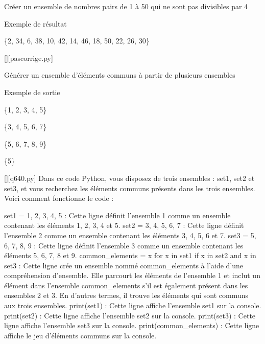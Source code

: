         \question
        Créer un ensemble de nombres pairs de 1 à 50 qui ne sont pas divisibles par 4

Exemple de résultat

\{2, 34, 6, 38, 10, 42, 14, 46, 18, 50, 22, 26, 30\}
        \par
        \begin{solution}
            \renewcommand{\nomfichier}{pascorrige.py}
            \pythonfile{\chemincode \nomfichier}[][\nomfichier]
            
        \end{solution}
        

        \question
        Générer un ensemble d'éléments communs à partir de plusieurs ensembles

Exemple de sortie

\{1, 2, 3, 4, 5\}

\{3, 4, 5, 6, 7\}

\{5, 6, 7, 8, 9\}

\{5\}
        \par
        \begin{solution}
            \renewcommand{\nomfichier}{q640.py}
            \pythonfile{\chemincode \nomfichier}[][\nomfichier]
            Dans ce code Python, vous disposez de trois ensembles : set1, set2 et set3, et vous recherchez les éléments communs présents dans les trois ensembles. Voici comment fonctionne le code :

    set1 = {1, 2, 3, 4, 5} : Cette ligne définit l'ensemble 1 comme un ensemble contenant les éléments 1, 2, 3, 4 et 5.
    set2 = {3, 4, 5, 6, 7} : Cette ligne définit l'ensemble 2 comme un ensemble contenant les éléments 3, 4, 5, 6 et 7.
    set3 = {5, 6, 7, 8, 9} : Cette ligne définit l'ensemble 3 comme un ensemble contenant les éléments 5, 6, 7, 8 et 9.
    common_elements = {x for x in set1 if x in set2 and x in set3} : Cette ligne crée un ensemble nommé common_elements à l'aide d'une compréhension d'ensemble. Elle parcourt les éléments de l'ensemble 1 et inclut un élément dans l'ensemble common_elements s'il est également présent dans les ensembles 2 et 3. En d'autres termes, il trouve les éléments qui sont communs aux trois ensembles.
    print(set1) : Cette ligne affiche l'ensemble set1 sur la console.
    print(set2) : Cette ligne affiche l'ensemble set2 sur la console.
    print(set3) : Cette ligne affiche l'ensemble set3 sur la console.
    print(common_elements) : Cette ligne affiche le jeu d'éléments communs sur la console.
        \end{solution}
        

